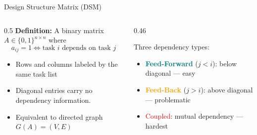 \documentclass[aspectratio=169]{beamer}
\newcommand{\highlight}[1]{\textcolor{teal}{\textbf{#1}}}
\newcommand{\alertword}[1]{\textcolor{orange}{\textbf{#1}}}
\begin{document}
\begin{frame}{Design Structure Matrix (DSM)}
  \begin{columns}[T]
    \begin{column}{0.5\textwidth}
      \textbf{Definition:} A binary matrix $A \in \{0,1\}^{n\times n}$ where
      \[
        a_{ij} = 1 \iff \text{task } i \text{ depends on task } j
      \]
      \begin{itemize}
        \item Rows and columns labeled by the same task list
        \item Diagonal entries carry no dependency information.
        \item Equivalent to directed graph $G(A) = (V,E)$
      \end{itemize}
      \vspace{0.4em}
    \end{column}
    \begin{column}{0.46\textwidth}
      \begin{block}{Three dependency types:}
        \begin{itemize}
          \item \highlight{Feed-Forward} ($j < i$): below diagonal — easy
          \item \alertword{Feed-Back} ($j > i$): above diagonal — problematic
          \item \textcolor{red}{Coupled}: mutual dependency — hardest
        \end{itemize}
      \end{block}
    \end{column}
  \end{columns}
\end{frame}
\end{document}
